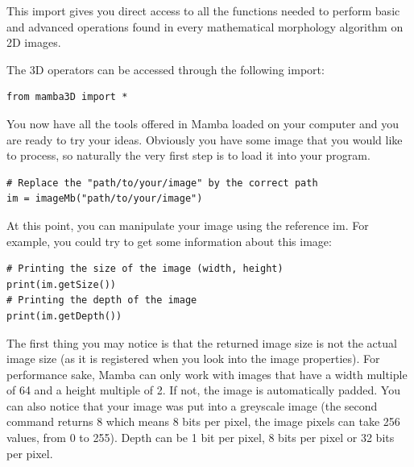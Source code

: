 \documentclass[a4paper,10pt,oneside]{article}
\begin{document}
This import gives you direct access to all the functions needed to 
perform basic and advanced operations found in every mathematical
morphology algorithm on 2D images.

The 3D operators can be accessed through the following import:

\lstset{language=Python}
\begin{lstlisting}
from mamba3D import *
\end{lstlisting}


You now have all the tools offered in Mamba loaded on your computer and you are
ready to try your ideas. Obviously you have some image that you would like to
process, so naturally the very first step is to load it into your program.

\lstset{language=Python}
\begin{lstlisting}
# Replace the "path/to/your/image" by the correct path
im = imageMb("path/to/your/image")
\end{lstlisting}

At this point, you can manipulate your image using the reference im. For example,
you could try to get some information about this image:

\lstset{language=Python}
\begin{lstlisting}
# Printing the size of the image (width, height)
print(im.getSize())
# Printing the depth of the image 
print(im.getDepth())
\end{lstlisting}

The first thing you may notice is that the returned image size is not the actual
image size (as it is registered when you look into the image properties). For
performance sake, Mamba can only work with images that have a width multiple of 64
and a height multiple of 2. If not, the image is automatically padded. You can 
also notice that your image was put into a greyscale image (the second command 
returns 8 which means 8 bits per pixel, the image pixels can take 256 values, from 
0 to 255). Depth can be 1 bit per pixel, 8 bits per pixel or 32 bits per pixel.
\end{document}
